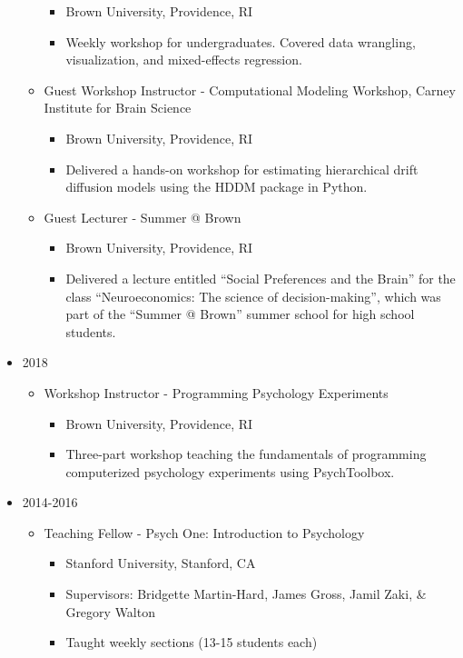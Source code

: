 \documentclass[
]{article}
\providecommand{\tightlist}{%
  \setlength{\itemsep}{0pt}\setlength{\parskip}{0pt}}
\begin{document}
\begin{itemize}
\begin{itemize}
    \begin{itemize}
    \tightlist
    \item
      Brown University, Providence, RI
    \item
      Weekly workshop for undergraduates. Covered data wrangling,
      visualization, and mixed-effects regression.
    \end{itemize}
  \item
    Guest Workshop Instructor - Computational Modeling Workshop, Carney
    Institute for Brain Science

    \begin{itemize}
    \tightlist
    \item
      Brown University, Providence, RI
    \item
      Delivered a hands-on workshop for estimating hierarchical drift
      diffusion models using the HDDM package in Python.
    \end{itemize}
  \item
    Guest Lecturer - Summer @ Brown

    \begin{itemize}
    \tightlist
    \item
      Brown University, Providence, RI
    \item
      Delivered a lecture entitled ``Social Preferences and the Brain''
      for the class ``Neuroeconomics: The science of decision-making'',
      which was part of the ``Summer @ Brown'' summer school for high
      school students.
    \end{itemize}
  \end{itemize}
\item
  2018

  \begin{itemize}
  \item
    Workshop Instructor - Programming Psychology Experiments

    \begin{itemize}
    \tightlist
    \item
      Brown University, Providence, RI
    \item
      Three-part workshop teaching the fundamentals of programming
      computerized psychology experiments using PsychToolbox.
    \end{itemize}
  \end{itemize}
\item
  2014-2016

  \begin{itemize}
  \item
    Teaching Fellow - Psych One: Introduction to Psychology

    \begin{itemize}
    \tightlist
    \item
      Stanford University, Stanford, CA
    \item
      Supervisors: Bridgette Martin-Hard, James Gross, Jamil Zaki, \&
      Gregory Walton
    \item
      Taught weekly sections (13-15 students each)
    \end{itemize}
  \end{itemize}
\end{itemize}
\end{document}
